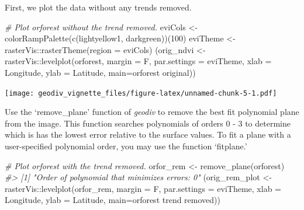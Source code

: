 \documentclass[
]{article}
\newenvironment{Shaded}{\begin{snugshade}}{\end{snugshade}}
\newcommand{\AttributeTok}[1]{\textcolor[rgb]{0.77,0.63,0.00}{#1}}
\newcommand{\CommentTok}[1]{\textcolor[rgb]{0.56,0.35,0.01}{\textit{#1}}}
\newcommand{\DecValTok}[1]{\textcolor[rgb]{0.00,0.00,0.81}{#1}}
\newcommand{\FunctionTok}[1]{\textcolor[rgb]{0.00,0.00,0.00}{#1}}
\newcommand{\NormalTok}[1]{#1}
\newcommand{\OtherTok}[1]{\textcolor[rgb]{0.56,0.35,0.01}{#1}}
\newcommand{\SpecialCharTok}[1]{\textcolor[rgb]{0.00,0.00,0.00}{#1}}
\newcommand{\StringTok}[1]{\textcolor[rgb]{0.31,0.60,0.02}{#1}}
\begin{document}
First, we plot the data without any trends removed.

\begin{Shaded}
\begin{Highlighting}[]
\CommentTok{\# Plot orforest without the trend removed.}
\NormalTok{eviCols }\OtherTok{\textless{}{-}} \FunctionTok{colorRampPalette}\NormalTok{(}\FunctionTok{c}\NormalTok{(}\StringTok{\textquotesingle{}lightyellow1\textquotesingle{}}\NormalTok{, }\StringTok{\textquotesingle{}darkgreen\textquotesingle{}}\NormalTok{))(}\DecValTok{100}\NormalTok{)}
\NormalTok{eviTheme }\OtherTok{\textless{}{-}}\NormalTok{ rasterVis}\SpecialCharTok{::}\FunctionTok{rasterTheme}\NormalTok{(}\AttributeTok{region =}\NormalTok{ eviCols)}
\NormalTok{(orig\_ndvi }\OtherTok{\textless{}{-}}\NormalTok{ rasterVis}\SpecialCharTok{::}\FunctionTok{levelplot}\NormalTok{(orforest, }\AttributeTok{margin =}\NormalTok{ F, }
                                  \AttributeTok{par.settings =}\NormalTok{ eviTheme, }\AttributeTok{xlab =} \StringTok{\textquotesingle{}Longitude\textquotesingle{}}\NormalTok{, }
                                  \AttributeTok{ylab =} \StringTok{\textquotesingle{}Latitude\textquotesingle{}}\NormalTok{, }\AttributeTok{main=}\StringTok{\textquotesingle{}orforest original\textquotesingle{}}\NormalTok{))}
\end{Highlighting}
\end{Shaded}

\texttt{[image: geodiv\_vignette\_files/figure-latex/unnamed-chunk-5-1.pdf]}

Use the `remove\_plane' function of \emph{geodiv} to remove the best fit
polynomial plane from the image. This function searches polynomials of
orders 0 - 3 to determine which is has the lowest error relative to the
surface values. To fit a plane with a user-specified polynomial order,
you may use the function `fitplane.'

\begin{Shaded}
\begin{Highlighting}[]
\CommentTok{\# Plot orforest with the trend removed.}
\NormalTok{orfor\_rem }\OtherTok{\textless{}{-}} \FunctionTok{remove\_plane}\NormalTok{(orforest)}
\CommentTok{\#\textgreater{} [1] "Order of polynomial that minimizes errors: 0"}
\NormalTok{(orig\_rem\_plot }\OtherTok{\textless{}{-}}\NormalTok{ rasterVis}\SpecialCharTok{::}\FunctionTok{levelplot}\NormalTok{(orfor\_rem, }\AttributeTok{margin =}\NormalTok{ F, }
                                      \AttributeTok{par.settings =}\NormalTok{ eviTheme, }
                                      \AttributeTok{xlab =} \StringTok{\textquotesingle{}Longitude\textquotesingle{}}\NormalTok{, }\AttributeTok{ylab =} \StringTok{\textquotesingle{}Latitude\textquotesingle{}}\NormalTok{, }
                                      \AttributeTok{main=}\StringTok{\textquotesingle{}orforest trend removed\textquotesingle{}}\NormalTok{))}
\end{Highlighting}
\end{Shaded}
\end{document}
